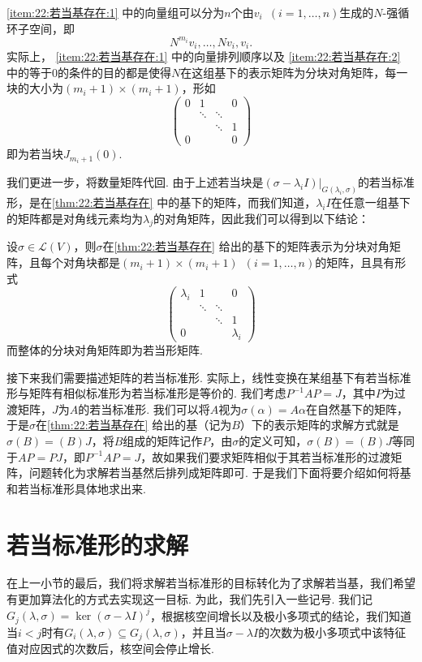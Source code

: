 \ref*{item:22:若当基存在:1} 中的向量组可以分为$n$个由$v_i\enspace(i=1,\ldots,n)$生成的$N$-强循环子空间，即
\[N^{m_i}v_i,\ldots,Nv_i,v_i.\]
实际上， \ref*{item:22:若当基存在:1} 中的向量排列顺序以及 \ref*{item:22:若当基存在:2} 中的等于0的条件的目的都是使得$N$在这组基下的表示矩阵为分块对角矩阵，每一块的大小为$(m_i+1)\times(m_i+1)$，形如\[\begin{pmatrix}
        0 & 1 &  & 0 \\  & \ddots & \ddots &  \\  &  &  \ddots & 1 \\ 0 &  &  & 0
    \end{pmatrix}\]即为若当块$J_{m_i+1}(0)$.

我们更进一步，将数量矩阵代回. 由于上述若当块是$(\sigma-\lambda_iI)\vert_{G(\lambda_i,\sigma)}$的若当标准形，是在\autoref{thm:22:若当基存在} 中的基下的矩阵，而我们知道，$\lambda_iI$在任意一组基下的矩阵都是对角线元素均为$\lambda_j$的对角矩阵，因此我们可以得到以下结论：
\begin{theorem}
    设$\sigma\in \mathcal{L}(V)$，则$\sigma$在\autoref{thm:22:若当基存在} 给出的基下的矩阵表示为分块对角矩阵，且每个对角块都是$(m_i+1)\times(m_i+1)\enspace(i=1,\ldots,n)$的矩阵，且具有形式\[\begin{pmatrix}
            \lambda_i & 1 &  & 0 \\  & \ddots & \ddots &  \\  &  &  \ddots & 1 \\ 0 &  &  & \lambda_i
        \end{pmatrix}\]而整体的分块对角矩阵即为若当形矩阵.
\end{theorem}

接下来我们需要描述矩阵的若当标准形. 实际上，线性变换在某组基下有若当标准形与矩阵有相似标准形为若当标准形是等价的. 我们考虑$P^{-1}AP=J$，其中$P$为过渡矩阵，$J$为$A$的若当标准形. 我们可以将$A$视为$\sigma(\alpha)=A\alpha$在自然基下的矩阵，于是$\sigma$在\autoref{thm:22:若当基存在} 给出的基（记为$B$）下的表示矩阵的求解方式就是$\sigma(B)=(B)J$，将$B$组成的矩阵记作$P$，由$\sigma$的定义可知，$\sigma(B)=(B)J$等同于$AP=PJ$，即$P^{-1}AP=J$，故如果我们要求矩阵相似于其若当标准形的过渡矩阵，问题转化为求解若当基然后排列成矩阵即可. 于是我们下面将要介绍如何将基和若当标准形具体地求出来.

\section{若当标准形的求解}

在上一小节的最后，我们将求解若当标准形的目标转化为了求解若当基，我们希望有更加算法化的方式去实现这一目标. 为此，我们先引入一些记号. 我们记$G_j(\lambda,\sigma)=\ker (\sigma-\lambda I)^j$，根据核空间增长以及极小多项式的结论，我们知道当$i<j$时有$G_i(\lambda,\sigma)\subseteq G_j(\lambda,\sigma)$，并且当$\sigma-\lambda I$的次数为极小多项式中该特征值对应因式的次数后，核空间会停止增长.

